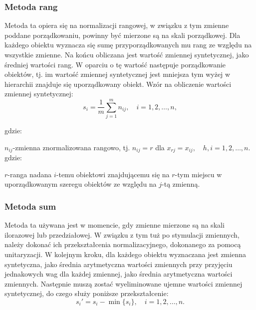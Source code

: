 \documentclass[12pt,a4paper]{report}
\begin{document}
\subsubsection{Metoda rang}


Metoda ta opiera się na normalizacji rangowej, w związku z tym zmienne poddane porządkowaniu, powinny być mierzone są na skali porządkowej. Dla każdego obiektu wyznacza się sumę przyporządkowanych mu rang ze względu na wszystkie zmienne. Na końcu obliczana jest wartość zmiennej syntetycznej, jako średniej wartości rang. W oparciu o tę wartość następuje porządkowanie obiektów, tj. im wartość zmiennej syntetycznej jest mniejsza tym wyżej w hierarchii znajduje się uporządkowany obiekt. Wzór na obliczenie wartości zmiennej syntetycznej: 
$$
s_{i}=\frac{1}{m}\sum_{j=1}^{m} n_{ij},\quad i=1, 2, \ldots, n,
$$

gdzie:

$n_{ij}$-zmienna znormalizowana rangowo, tj.
$
n_{ij}=r$ dla $x_{rj}=x_{ij}, \quad h,i=1, 2, \ldots, n.
$
gdzie:

$r$-ranga nadana $i$-temu obiektowi znajdującemu się na $r$-tym miejscu w uporządkowanym szeregu obiektów ze względu na $j$-tą zmienną.


\subsubsection{Metoda sum}


Metoda ta używana jest w momencie, gdy zmienne mierzone są na skali ilorazowej lub przedziałowej. W związku z tym tuż po stymulacji zmiennych, należy dokonać ich przekształcenia normalizacyjnego, dokonanego za pomocą unitaryzacji. W kolejnym kroku, dla każdego obiektu wyznaczana jest zmienna syntetyczna, jako średnia arytmetyczna wartości zmiennych przy przyjęciu jednakowych wag dla każdej zmiennej, jako średnia arytmetyczna wartości zmiennych.
Następnie muszą zostać wyeliminowane ujemne wartości zmiennej syntetycznej, do czego służy poniższe przekształcenie:
$$
s_{i}'=s_{i}-\min\{s_i\}, \quad i=1, 2, \ldots, n.
$$
\end{document}
